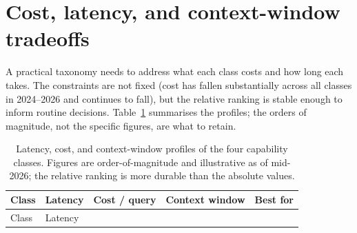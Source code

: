 \documentclass[
  letterpaper,
  11pt]{scrbook}
\begin{document}
\section{Cost, latency, and context-window
tradeoffs}\label{cost-latency-and-context-window-tradeoffs}

A practical taxonomy needs to address what each class costs and how long
each takes. The constraints are not fixed (cost has fallen substantially
across all classes in 2024--2026 and continues to fall), but the
relative ranking is stable enough to inform routine decisions.
Table~\ref{tbl-class-costs} summarises the profiles; the orders of
magnitude, not the specific figures, are what to retain.

\begin{longtable}[]{@{}
  >{\raggedright\arraybackslash}p{}
  >{\raggedright\arraybackslash}p{}
  >{\raggedright\arraybackslash}p{}
  >{\raggedright\arraybackslash}p{}
  >{\raggedright\arraybackslash}p{}@{}}
\caption{Latency, cost, and context-window profiles of the four
capability classes. Figures are order-of-magnitude and illustrative as
of mid-2026; the relative ranking is more durable than the absolute
values.}\label{tbl-class-costs}\tabularnewline
\toprule\noalign{}
\begin{minipage}[b]{\linewidth}\raggedright
Class
\end{minipage} & \begin{minipage}[b]{\linewidth}\raggedright
Latency
\end{minipage} & \begin{minipage}[b]{\linewidth}\raggedright
Cost / query
\end{minipage} & \begin{minipage}[b]{\linewidth}\raggedright
Context window
\end{minipage} & \begin{minipage}[b]{\linewidth}\raggedright
Best for
\end{minipage} \\
\midrule\noalign{}
\endfirsthead
\toprule\noalign{}
\begin{minipage}[b]{\linewidth}\raggedright
Class
\end{minipage} & \begin{minipage}[b]{\linewidth}\raggedright
Latency
\end{minipage} & \begin{minipage}[b]{\linewidth}\raggedright

\end{minipage}
\end{longtable}
\end{document}
